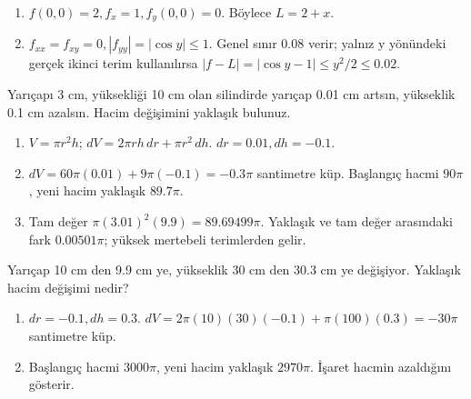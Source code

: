 \begin{tcolorbox}[title={Adım adım çözüm},colback=green!3!white,colframe=green]\begin{enumerate}
\item \(f(0,0)=2,f_x=1,f_y(0,0)=0\). Böylece \(L=2+x\).
\item \(f_{xx}=f_{xy}=0,|f_{yy}|=|\cos y|\le1\). Genel sınır 0.08 verir; yalnız y yönündeki gerçek ikinci terim kullanılırsa \(|f-L|=|\cos y-1|\le y^2/2\le0.02\).
\end{enumerate}\end{tcolorbox}
\begin{tcolorbox}[title={Örnek 5.11 | Tahtadaki silindir hacmi değişimi},colframe=accent]Yarıçapı 3 cm, yüksekliği 10 cm olan silindirde yarıçap 0.01 cm artsın, yükseklik 0.1 cm azalsın. Hacim değişimini yaklaşık bulunuz.
\par{}\end{tcolorbox}
\begin{tcolorbox}[title={Adım adım çözüm},colback=green!3!white,colframe=green]\begin{enumerate}
\item \(V=\pi r^2h\); \(dV=2\pi rh\,dr+\pi r^2\,dh\). \(dr=0.01,dh=-0.1\).
\item \(dV=60\pi(0.01)+9\pi(-0.1)=-0.3\pi\) santimetre küp. Başlangıç hacmi \(90\pi\), yeni hacim yaklaşık \(89.7\pi\).
\item Tam değer \(\pi(3.01)^2(9.9)=89.69499\pi\). Yaklaşık ve tam değer arasındaki fark \(0.00501\pi\); yüksek mertebeli terimlerden gelir.
\end{enumerate}\end{tcolorbox}
\begin{tcolorbox}[title={Örnek 5.12 | Silindir için ikinci ders sorusu},colframe=accent]Yarıçap 10 cm den 9.9 cm ye, yükseklik 30 cm den 30.3 cm ye değişiyor. Yaklaşık hacim değişimi nedir?
\par{}\end{tcolorbox}
\begin{tcolorbox}[title={Adım adım çözüm},colback=green!3!white,colframe=green]\begin{enumerate}
\item \(dr=-0.1,dh=0.3\). \(dV=2\pi(10)(30)(-0.1)+\pi(100)(0.3)=-30\pi\) santimetre küp.
\item Başlangıç hacmi \(3000\pi\), yeni hacim yaklaşık \(2970\pi\). İşaret hacmin azaldığını gösterir.
\end{enumerate}\end{tcolorbox}

